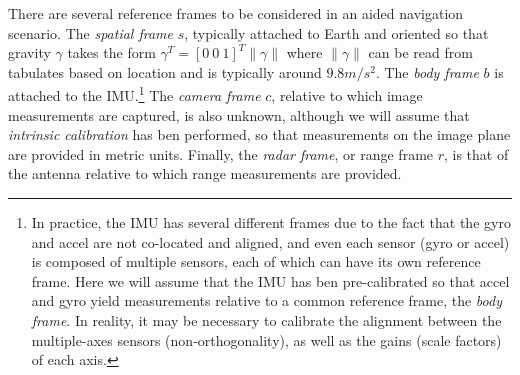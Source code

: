 \documentclass[]{article}
\begin{document}
There are several reference frames to be considered in an aided navigation scenario. The {\em spatial frame} $s$, typically attached to Earth and oriented so that gravity $\gamma$ takes the form $\gamma^T = [0 \ 0 \ 1]^T \| \gamma \|$ where $\| \gamma \|$ can be read from tabulates based on location and is typically around $9.8m/s^2$. The {\em body frame} $b$ is attached to the IMU.\footnote{In practice, the IMU has several different frames due to the fact that the gyro and accel are not co-located and aligned, and even each sensor (gyro or accel) is composed of multiple sensors, each of which can have its own reference frame. Here we will assume that the IMU has ben pre-calibrated so that accel and gyro yield measurements relative to a common reference frame, the {\em body frame}. In reality, it may be necessary to calibrate the alignment between the multiple-axes sensors (non-orthogonality), as well as the gains (scale factors) of each axis.} The {\em camera frame} $c$, relative to 
which image 
measurements are captured, is also unknown, although we will assume that {\em intrinsic calibration} has ben performed, so that measurements on the image plane are provided in metric units. Finally, the {\em radar frame}, or range frame $r$, is that of the antenna relative to which range measurements are provided.
\end{document}
